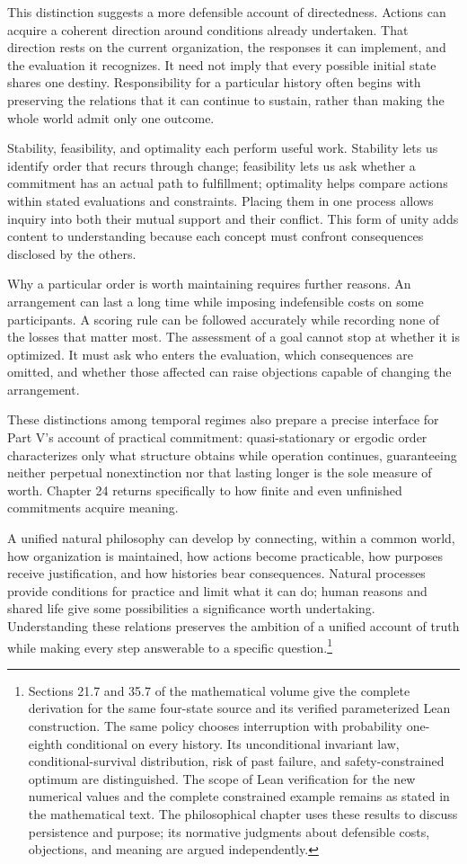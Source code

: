 \documentclass[
  english,
  11pt,
  oneside]{book}
\newcounter{none} %
\begin{document}
This distinction suggests a more defensible account of directedness. Actions can acquire a coherent direction around conditions already undertaken. That direction rests on the current organization, the responses it can implement, and the evaluation it recognizes. It need not imply that every possible initial state shares one destiny. Responsibility for a particular history often begins with preserving the relations that it can continue to sustain, rather than making the whole world admit only one outcome.

Stability, feasibility, and optimality each perform useful work. Stability lets us identify order that recurs through change; feasibility lets us ask whether a commitment has an actual path to fulfillment; optimality helps compare actions within stated evaluations and constraints. Placing them in one process allows inquiry into both their mutual support and their conflict. This form of unity adds content to understanding because each concept must confront consequences disclosed by the others.

Why a particular order is worth maintaining requires further reasons. An arrangement can last a long time while imposing indefensible costs on some participants. A scoring rule can be followed accurately while recording none of the losses that matter most. The assessment of a goal cannot stop at whether it is optimized. It must ask who enters the evaluation, which consequences are omitted, and whether those affected can raise objections capable of changing the arrangement.

These distinctions among temporal regimes also prepare a precise interface for Part V's account of practical commitment: quasi-stationary or ergodic order characterizes only what structure obtains while operation continues, guaranteeing neither perpetual nonextinction nor that lasting longer is the sole measure of worth. Chapter 24 returns specifically to how finite and even unfinished commitments acquire meaning.

A unified natural philosophy can develop by connecting, within a common world, how organization is maintained, how actions become practicable, how purposes receive justification, and how histories bear consequences. Natural processes provide conditions for practice and limit what it can do; human reasons and shared life give some possibilities a significance worth undertaking. Understanding these relations preserves the ambition of a unified account of truth while making every step answerable to a specific question.\footnote{\hypertarget{ph-note-38}{}Sections 21.7 and 35.7 of the mathematical volume give the complete derivation for the same four-state source and its verified parameterized Lean construction. The same policy chooses interruption with probability one-eighth conditional on every history. Its unconditional invariant law, conditional-survival distribution, risk of past failure, and safety-constrained optimum are distinguished. The scope of Lean verification for the new numerical values and the complete constrained example remains as stated in the mathematical text. The philosophical chapter uses these results to discuss persistence and purpose; its normative judgments about defensible costs, objections, and meaning are argued independently.}
\end{document}
